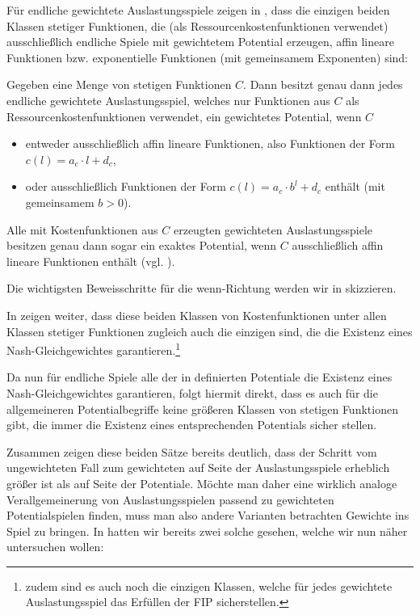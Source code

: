 Für endliche gewichtete Auslastungsspiele zeigen \citeauthor{CharExGewPotinWCG} in \cite[Theorem 3.9]{CharExGewPotinWCG}, dass die einzigen beiden Klassen stetiger Funktionen, die (als Ressourcenkostenfunktionen verwendet) ausschließlich endliche Spiele mit gewichtetem Potential erzeugen, affin lineare Funktionen bzw. exponentielle Funktionen (mit gemeinsamem Exponenten) sind:

\begin{satz}\label{satz:CharExGewPotinWCG}
	Gegeben eine Menge von stetigen Funktionen $C$. Dann besitzt genau dann jedes endliche gewichtete Auslastungsspiel, welches nur Funktionen aus $C$ als Ressourcenkostenfunktionen verwendet, ein gewichtetes Potential, wenn $C$
	\begin{itemize}
		\item entweder ausschließlich affin lineare Funktionen, also Funktionen der Form $c(l) = a_c \cdot l + d_c$,
		\item oder ausschließlich Funktionen der Form $c(l) = a_c\cdot b^l + d_c$ enthält (mit gemeinsamem $b > 0$).
	\end{itemize}
	Alle mit Kostenfunktionen aus $C$ erzeugten gewichteten Auslastungsspiele besitzen genau dann sogar ein exaktes Potential, wenn $C$ ausschließlich affin lineare Funktionen enthält (vgl. \cite[Theorem 3.7]{CharExGewPotinWCG}).
\end{satz}

Die wichtigsten Beweisschritte für die \glqq wenn\grqq-Richtung werden wir in  skizzieren.

In \cite[Theorem 5.1]{CharExNGinWCG} zeigen \citeauthor{CharExNGinWCG} weiter, dass diese beiden Klassen von Kostenfunktionen unter allen Klassen stetiger Funktionen zugleich auch die einzigen sind, die die Existenz eines Nash-Gleichgewichtes garantieren.\footnote{zudem sind es auch noch die einzigen Klassen, welche für jedes gewichtete Auslastungsspiel das Erfüllen der FIP sicherstellen.}

Da nun für endliche Spiele alle der in  definierten Potentiale die Existenz eines Nash-Gleichgewichtes garantieren, folgt hiermit direkt, dass es auch für die allgemeineren Potentialbegriffe keine größeren Klassen von stetigen Funktionen gibt, die immer die Existenz eines entsprechenden Potentials sicher stellen.

Zusammen zeigen diese beiden Sätze bereits deutlich, dass der Schritt vom ungewichteten Fall zum gewichteten auf Seite der Auslastungsspiele erheblich größer ist als auf Seite der Potentiale. Möchte man daher eine wirklich analoge Verallgemeinerung von Auslastungsspielen passend zu gewichteten Potentialspielen finden, muss man also andere Varianten betrachten Gewichte ins Spiel zu bringen. In  hatten wir bereits zwei solche gesehen, welche wir nun näher untersuchen wollen:

